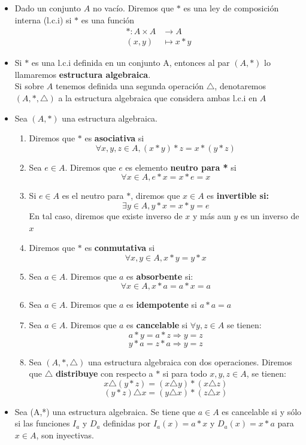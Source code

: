 \documentclass[letterpaper,10pt]{article}
\theoremstyle{plain}
\begin{document}
\begin{framed}
	\begin{multicols}{2}
	    \begin{itemize}
	        \item Dado un conjunto $A$ no vacío. Diremos que $*$ es una ley de composición interna (l.c.i) si $*$ es una función  
    \begin{align*}
            *: A\times A & \to A\\
                (x,y)   & \mapsto x*y
    \end{align*}
        
    \item Si $*$ es una l.c.i definida en un conjunto A, entonces al par $(A,*)$ lo llamaremos \textbf{estructura algebraica}.\\ Si sobre $A$ tenemos definida una segunda operación $\triangle$, denotaremos $(A,*,\triangle)$ a la estructura algebraica que considera ambas l.c.i en $A$
    
    \item Sea $(A,*)$ una estructura algebraica.
        \begin{enumerate}
            \item Diremos que $*$ es \textbf{asociativa} si $$\forall x,y,z \in A, (x*y)*z=x*(y*z) $$
            \item Sea $e\in A$. Diremos que $e$ es elemento \textbf{neutro para *} si
            $$\forall x\in A, e*x=x*e=x$$
            \item Si $e\in A$ es el neutro para $*$, diremos que $x\in A$ es \textbf{invertible si:}$$\exists y\in A, y*x=x*y=e$$
            En tal caso, diremos que existe inverso de $x$ y más aun $y$ es un inverso de $x$
            \item Diremos que $*$ es \textbf{conmutativa} si $$ \forall x,y \in A, x*y=y*x $$
            \item Sea $a\in A$. Diremos que $a$ es \textbf{absorbente} si:
            $$\forall x\in A, x*a=a*x=a $$
            \item Sea $a\in A$. Diremos que $a$ es \textbf{idempotente} si $a*a=a$
            \item Sea $a\in A$. Diremos que $a$ es \textbf{cancelable} si $\forall y,z \in A$ se tienen:
            $$a*y=a*z\Rightarrow y=z $$
            $$y*a=z*a\Rightarrow y=z $$
            \item Sea $(A,*,\triangle)$ una estructura algebraica con dos operaciones. Diremos que $\triangle$ \textbf{distribuye} con respecto a $*$ si para todo $x,y,z \in A$, se tienen:
            $$x\triangle(y*z)=(x\triangle y)*(x\triangle z)$$
            $$(y*z)\triangle x=(y\triangle x)*(z \triangle x) $$
        \end{enumerate}
    \item Sea (A,*) una estructura algebraica. Se tiene que $a \in A$ es cancelable si y sólo si las funciones $I_a$ y $D_a$ definidas por $I_a(x)=a*x$ y $D_a(x)=x*a$ para $x \in A$, son inyectivas.
    

\end{itemize}
\end{multicols}
\end{framed}
\end{document}
